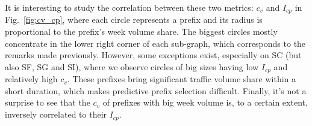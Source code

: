 It is interesting to study the correlation between these two metrics: $c_v$ %
and $I_{cp}$ in Fig.~\ref{fig:cv_cp}, where each circle represents a prefix and its radius is proportional to the prefix's week volume share.
The biggest circles mostly concentrate in the lower right corner of each sub-graph, which corresponds to the remarks made previously.
However, some exceptions exist, especially on SC (but also SF, SG and SI), where we observe circles of big sizes having low $I_{cp}$ and relatively high $c_v$.
These prefixes bring significant traffic volume share within a short duration, which makes predictive prefix selection difficult. 
Finally, it's not a surprise to see that the $c_v$ of prefixes with big week volume is, to a certain extent, inversely correlated to their $I_{cp}$.

